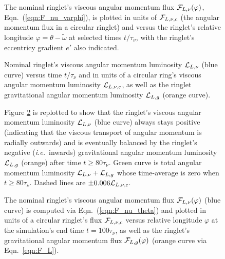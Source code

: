 \documentclass[preprint]{aastex62}
\begin{document}
\begin{figure}
    \caption{
        \label{fig:F_nu_nominal}
        The nominal ringlet's viscous angular momentum flux ${\cal F}_{L,\nu}(\varphi)$,
        Eqn.\ (\ref{eqn:F_nu_varphi}), is plotted 
        in units of ${\cal F}_{L,\nu,c}$ (the angular momentum flux in a circular ringlet)
        and versus the ringlet's
        relative longitude $\varphi=\theta-\tilde{\omega}$ at selected times $t/\tau_\nu$, 
        with the ringlet's eccentricy gradient $e'$ also indicated.
    }
\end{figure}

\begin{figure}
    \caption{
        \label{fig:angular_momentum_luminosity_nominal}
        Nominal ringlet's viscous angular momentum luminosity ${\cal L}_{L,\nu}$ (blue curve) versus time $t/\tau_\nu$
        and in units of a circular ring's viscous angular momentum luminosity ${\cal L}_{L,\nu,c}$, 
        as well as the ringlet gravitational angular momentum luminosity ${\cal L}_{L,g}$ (orange curve).
    }
\end{figure}

\begin{figure}
    \caption{
        \label{fig:angular_momentum_luminosity_zoom_nominal}
        Figure \ref{fig:angular_momentum_luminosity_nominal} is replotted to show that the ringlet's 
        viscous angular momentum luminosity ${\cal L}_{L,\nu}$ (blue curve)
        always stays positive (indicating that the viscous transport of angular momentum is radially outwards)
        and is eventually balanced by the ringlet's negative ({\it i.e.}\ inwards) gravitational angular momentum luminosity 
        ${\cal L}_{L,g}$ (orange) after time $t\ge 80\tau_\nu$. Green curve is total angular momentum luminosity 
        ${\cal L}_{L,\nu} + {\cal L}_{L,g}$ whose time-average is zero when $t\ge 80\tau_\nu$.
        Dashed lines are $\pm0.006{\cal L}_{L,\nu,c}$.
    }
\end{figure}

\begin{figure}
    \caption{
        \label{fig:F_vs_longitude_nominal}
        The nominal ringlet's viscous angular momentum flux ${\cal F}_{L,\nu}(\varphi)$ (blue curve) is computed
        via Eqn.\ (\ref{eqn:F_nu_theta}) and plotted in units of a circular ringlet's flux ${\cal F}_{L,\nu,c}$
        versus relative longitude $\varphi$ at the simulation's end time $t=100\tau_\nu$, 
        as well as the ringlet's gravitational angular momentum flux ${\cal F}_{L,g}(\varphi)$
        (orange curve via Eqn.\ \ref{eqn:F_L}).
    }
\end{figure}
\end{document}
